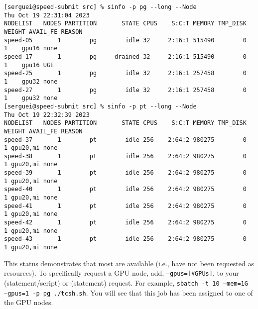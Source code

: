 \scriptsize
\begin{verbatim}
[serguei@speed-submit src] % sinfo -p pg --long --Node
Thu Oct 19 22:31:04 2023
NODELIST   NODES PARTITION       STATE CPUS    S:C:T MEMORY TMP_DISK WEIGHT AVAIL_FE REASON
speed-05       1        pg        idle 32     2:16:1 515490        0      1    gpu16 none
speed-17       1        pg     drained 32     2:16:1 515490        0      1    gpu16 UGE
speed-25       1        pg        idle 32     2:16:1 257458        0      1    gpu32 none
speed-27       1        pg        idle 32     2:16:1 257458        0      1    gpu32 none
[serguei@speed-submit src] % sinfo -p pt --long --Node
Thu Oct 19 22:32:39 2023
NODELIST   NODES PARTITION       STATE CPUS    S:C:T MEMORY TMP_DISK WEIGHT AVAIL_FE REASON
speed-37       1        pt        idle 256    2:64:2 980275        0      1 gpu20,mi none
speed-38       1        pt        idle 256    2:64:2 980275        0      1 gpu20,mi none
speed-39       1        pt        idle 256    2:64:2 980275        0      1 gpu20,mi none
speed-40       1        pt        idle 256    2:64:2 980275        0      1 gpu20,mi none
speed-41       1        pt        idle 256    2:64:2 980275        0      1 gpu20,mi none
speed-42       1        pt        idle 256    2:64:2 980275        0      1 gpu20,mi none
speed-43       1        pt        idle 256    2:64:2 980275        0      1 gpu20,mi none
\end{verbatim}

This status demonstrates that most are available (i.e., have not been 
requested as resources). To specifically request a GPU node, add,
\texttt{--gpus=[\#GPUs]}, to your  (statement/script) or
 (statement) request. For example,
\texttt{sbatch -t 10 --mem=1G --gpus=1 -p pg ./tcsh.sh}. You 
will see that this job has been assigned to one of the GPU nodes.


